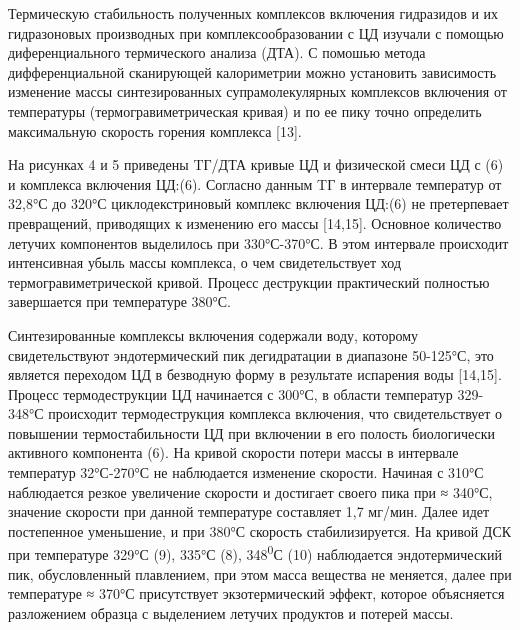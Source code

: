 \begin{multicols}{2}

Термическую стабильность полученных комплексов включения гидразидов и их
гидразоновых производных при комплексообразовании с ЦД изучали с помощью
диференциального термического анализа (ДТА). С помошью метода
дифференциальной сканирующей калориметрии можно установить зависимость
изменение массы синтезированных супрамолекулярных комплексов включения
от температуры (термогравиметрическая кривая) и по ее пику точно
определить максимальную скорость горения комплекса {[}13{]}.

На рисунках 4 и 5 приведены TГ/ДТА кривые ЦД и физической смеси ЦД с (6)
и комплекса включения ЦД:(6). Согласно данным TГ в интервале температур
от 32,8°С до 320°С циклодекстриновый комплекс включения ЦД:(6) не
претерпевает превращений, приводящих к изменению его массы {[}14,15{]}.
Основное количество летучих компонентов выделилось при 330°С-370°С. В
этом интервале происходит интенсивная убыль массы комплекса, о чем
свидетельствует ход термогравиметрической кривой. Процесс деструкции
практический полностью завершается при температуре 380°С.

Синтезированные комплексы включения содержали воду, которому
свидетельствуют эндотермический пик дегидратации в диапазоне 50-125°С,
это является переходом ЦД в безводную форму в результате испарения воды
{[}14,15{]}. Процесс термодеструкции ЦД начинается с 300°С, в области
температур 329-348°С происходит термодеструкция комплекса включения, что
свидетельствует о повышении термостабильности ЦД при включении в его
полость биологически активного компонента (6). На кривой скорости потери
массы в интервале температур 32°С-270°С не наблюдается изменение
скорости. Начиная с 310°С наблюдается резкое увеличение скорости и
достигает своего пика при ≈ 340°С, значение скорости при данной
температуре составляет 1,7 мг/мин. Далее идет постепенное уменьшение, и
при 380°С скорость стабилизируется. На кривой ДСК при температуре 329°С
(9), 335°С (8), 348\textsuperscript{0}С (10) наблюдается эндотермический
пик, обусловленный плавлением, при этом масса вещества не меняется,
далее при температуре ≈ 370°С присутствует экзотермический эффект,
которое объясняется разложением образца с выделением летучих продуктов и
потерей массы.


\end{multicols}
